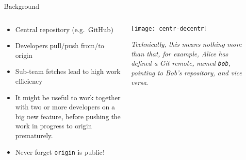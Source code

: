 \documentclass[usenames,svgnames,14pt]{beamer}
\begin{document}
\begin{frame}[c]{Background}
    \vspace{-3mm}
    \begin{columns}[c]
        \begin{column}{0.5\textwidth}
            \small
            \setlength{\leftmargini}{7mm}
            \begin{itemize}
                \setlength{\itemsep}{0mm}
                \item Central repository (e.g.\ GitHub)
                \item Developers pull/push from/to origin
                \item Sub-team fetches lead to high work efficiency
                \item It might be useful to work together with two or more developers on a big new feature,
                before pushing the work in progress to origin prematurely.
                \item \alert{Never forget \texttt{origin} is public!}
            \end{itemize}
        \end{column}
        \begin{column}{0.45\textwidth}
            \vspace{3mm}
            \centering
            \texttt{[image: centr-decentr]}
            \begin{block}{}
                \footnotesize\itshape
                Technically, this means nothing more than that, for example, Alice has defined a Git remote,
                named \textnormal{\texttt{bob}}, pointing to Bob's repository, and vice versa.
            \end{block}
        \end{column}
    \end{columns}
\end{frame}

\end{document}
